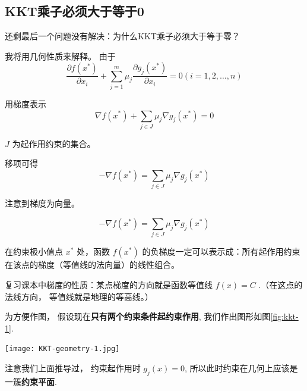 \subsection{KKT乘子必须大于等于0}

\begin{problem}
    还剩最后一个问题没有解决：为什么KKT乘子必须大于等于零？
\end{problem}

我将用几何性质来解释。 由于
\begin{equation}
\frac{\partial f\left(x^{*}\right)}{\partial x_{i}}+\sum_{j=1}^{m} \mu_{j} \frac{\partial g_{j}\left(x^{*}\right)}{\partial x_{i}}=0(i=1,2, \ldots, n)
\end{equation}

用梯度表示 \begin{equation} \nabla f\left({x}^{*}\right)+\sum_{j \in J} \mu_{j} \nabla g_{j}\left({x}^{*}\right)=0\end{equation}

$J$ 为起作用约束的集合。

移项可得 \begin{equation} -\nabla f\left({x}^{*}\right)=\sum_{j \in J} \mu_{j} \nabla g_{j}\left({x}^{*}\right) \end{equation}

注意到梯度为向量。 

\begin{theorem}
    \begin{equation} -\nabla f\left({x}^{*}\right)=\sum_{j \in J} \mu_{j} \nabla g_{j}\left({x}^{*}\right) \end{equation}

    在约束极小值点 $ {x}^{*} $ 处，函数 $ f\left({x}^{*}\right) $ 的负梯度一定可以表示成：所有起作用约束在该点的梯度（等值线的法向量）的线性组合。
\end{theorem}


\begin{corollary}[梯度的性质]
    复习课本中梯度的性质：某点梯度的方向就是函数等值线 $ f({x})=C $ .（在这点的法线方向， 等值线就是地理的等高线。）
\end{corollary}

为方便作图， 假设现在\textbf{只有两个约束条件起约束作用}, 我们作出图形如图\ref{fig:kkt-1}.

\begin{FigureCenter}{}
    \label{fig:kkt-1}
    \texttt{[image: KKT-geometry-1.jpg]}
\end{FigureCenter}


注意我们上面推导过， 约束起作用时 $ g_{j}({x})=0 $, 所以此时约束在几何上应该是一簇\textbf{约束平面}.


